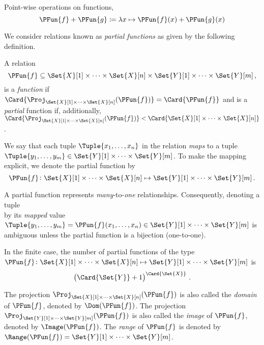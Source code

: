 \documentclass[ ../main.tex]{subfiles}
\begin{document}
Point-wise operations on functions,
\begin{equation}
\PFun{f} + \PFun{g} \coloneq \lambda x \mapsto \PFun{f}(x) + \PFun{g}(x)
\end{equation}








We consider relations known as \emph{partial functions} as given by the following definition.
\begin{definition}
	A relation
	\begin{equation}
	\PFun{f} \subseteq \Set{X}[1] \times \cdots \times \Set{X}[n] \times \Set{Y}[1] \times \cdots \times \Set{Y}[m]\,,
	\end{equation}
	is a \emph{function} if $\Card{\Proj_{\Set{X}[1] \times \cdots \times \Set{X}[n]}(\PFun{f})} = \Card{\PFun{f}}$ and is a \emph{partial} function if, additionally, $\Card{\Proj_{\Set{X}[1] \times \cdots \times \Set{X}[n]}(\PFun{f})} < \Card{\Set{X}[1] \times \cdots \times \Set{X}[n]}$.
	
	We say that each tuple $\Tuple{x_1,\ldots,x_n}$ in the relation \emph{maps} to a tuple $\Tuple{y_1,\ldots,y_m} \in \Set{Y}[1] \times \cdots \times \Set{Y}[m]$. To make the mapping explicit, we denote the partial function by
	\begin{equation}
	\PFun{f} \colon \Set{X}[1] \times \cdots \times \Set{X}[n] \mapsto \Set{Y}[1] \times \cdots \times \Set{Y}[m]\,.
	\end{equation}
\end{definition}
A partial function represents \emph{many}-to-\emph{one} relationships. Consequently, denoting a tuple
\begin{equation}
\end{equation}
by its \emph{mapped} value $\Tuple{y_1,\ldots,y_m} = \PFun{f}(x_1,\ldots,x_n) \in \Set{Y}[1] \times \cdots \times \Set{Y}[m]$ is ambiguous unless the partial function is a bijection (one-to-one).

In the finite case, the number of partial functions of the type $\PFun{f} \colon \Set{X}[1] \times \cdots \times \Set{X}[n] \mapsto \Set{Y}[1] \times \cdots \times \Set{Y}[m]$ is
\begin{equation}
\left(\Card{\Set{Y}} + 1\right)^{\Card{\Set{X}}}\,.
\end{equation}

The projection $\Proj_{\Set{X}[1] \times \cdots \times \Set{X}[n]}(\PFun{f})$ is also called the \emph{domain} of $\PFun{f}$, denoted by $\Dom(\PFun{f})$. The projection $\Proj_{\Set{Y}[1] \times \cdots \times \Set{Y}[m]}(\PFun{f})$ is also called the \emph{image} of $\PFun{f}$, denoted by $\Image(\PFun{f})$. The \emph{range} of $\PFun{f}$ is denoted by $\Range(\PFun{f}) = \Set{Y}[1] \times \cdots \times \Set{Y}[m]$.
\end{document}
